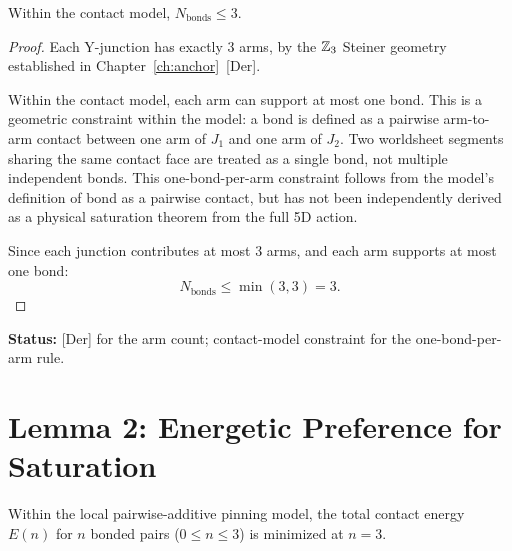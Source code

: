 \begin{lemma}
\label{lem:upper_bound}
Within the contact model, $N_{\text{bonds}} \leq 3$.
\end{lemma}

\begin{proof}
Each Y-junction has exactly 3 arms, by the $\mathbb{Z}_3$ Steiner geometry
established in Chapter~\ref{ch:anchor}~[Der].

Within the contact model, each arm can support at most one bond. This is
a geometric constraint within the model: a bond is defined as a pairwise
arm-to-arm contact between one arm of $J_1$ and one arm of $J_2$. Two
worldsheet segments sharing the same contact face are treated as a single
bond, not multiple independent bonds. This one-bond-per-arm constraint
follows from the model's definition of bond as a pairwise contact, but
has not been independently derived as a physical saturation theorem from
the full 5D action.

Since each junction contributes at most 3 arms, and each arm supports at
most one bond:
\begin{equation}
    N_{\text{bonds}} \leq \min(3, 3) = 3.
    \label{eq:nbonds_upper}
\end{equation}
\end{proof}

\textbf{Status:} [Der] for the arm count; contact-model constraint for
the one-bond-per-arm rule.

\section{Lemma 2: Energetic Preference for Saturation}

\begin{lemma}
\label{lem:saturation}
Within the local pairwise-additive pinning model, the total contact energy
$E(n)$ for $n$ bonded pairs ($0 \leq n \leq 3$) is minimized at $n = 3$.
\end{lemma}

